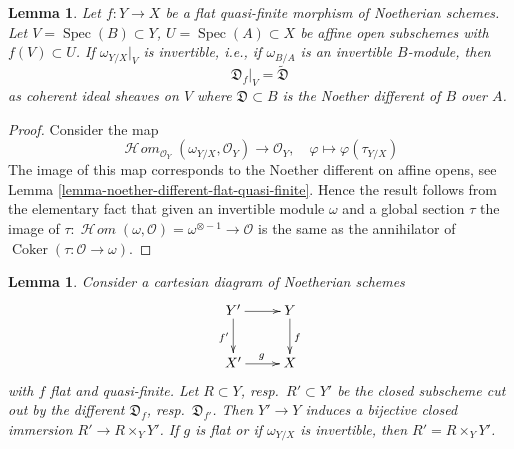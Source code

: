 \documentclass{stacks-project}
\theoremstyle{plain}
\newtheorem{lemma}[subsection]{Lemma}
\theoremstyle{definition}
\theoremstyle{remark}
\numberwithin{equation}{subsection}
\def\Spec{\mathop{\mathrm{Spec}}}
\def\SheafHom{\mathop{\mathcal{H}\!\mathit{om}}\nolimits}
\def\Coker{\mathop{\mathrm{Coker}}}
\begin{document}
\begin{lemma}
\label{lemma-flat-gorenstein-agree-noether}
Let $f : Y \to X$ be a flat quasi-finite morphism of Noetherian schemes.
Let $V = \Spec(B) \subset Y$, $U = \Spec(A) \subset X$
be affine open subschemes with $f(V) \subset U$.
If $\omega_{Y/X}|_V$ is invertible, i.e., if $\omega_{B/A}$
is an invertible $B$-module, then
$$
\mathfrak{D}_f|_V = \widetilde{\mathfrak{D}}
$$
as coherent ideal sheaves on $V$ where
$\mathfrak{D} \subset B$ is the Noether different of $B$ over $A$.
\end{lemma}

\begin{proof}
Consider the map
$$
\SheafHom_{\mathcal{O}_Y}(\omega_{Y/X}, \mathcal{O}_Y)
\longrightarrow
\mathcal{O}_Y,\quad
\varphi \longmapsto \varphi(\tau_{Y/X})
$$
The image of this map corresponds to the Noether different
on affine opens, see Lemma \ref{lemma-noether-different-flat-quasi-finite}.
Hence the result follows from the elementary fact that given
an invertible module $\omega$ and a global section $\tau$
the image of
$\tau : \SheafHom(\omega, \mathcal{O}) = \omega^{\otimes -1} \to \mathcal{O}$
is the same as the annihilator of $\Coker(\tau : \mathcal{O} \to \omega)$.
\end{proof}

\begin{lemma}
\label{lemma-base-change-different}
Consider a cartesian diagram of Noetherian schemes
$$
\xymatrix{
Y' \ar[d]_{f'} \ar[r] & Y \ar[d]^f \\
X' \ar[r]^g & X
}
$$
with $f$ flat and quasi-finite. Let $R \subset Y$, resp.\ $R' \subset Y'$
be the closed subscheme cut out by the different
$\mathfrak{D}_f$, resp.\ $\mathfrak{D}_{f'}$.
Then $Y' \to Y$ induces a bijective closed immersion $R' \to R \times_Y Y'$.
If $g$ is flat or if $\omega_{Y/X}$ is invertible, then
$R' = R \times_Y Y'$.
\end{lemma}
\end{document}
